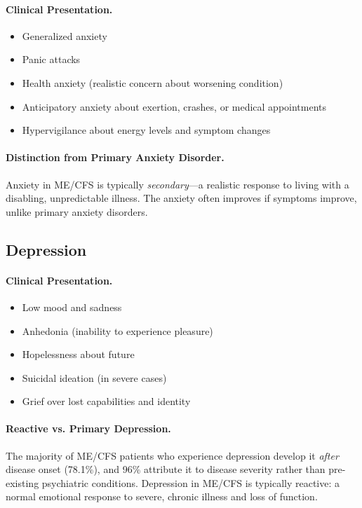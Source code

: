 \paragraph{Clinical Presentation.}
\begin{itemize}
    \item Generalized anxiety
    \item Panic attacks
    \item Health anxiety (realistic concern about worsening condition)
    \item Anticipatory anxiety about exertion, crashes, or medical appointments
    \item Hypervigilance about energy levels and symptom changes
\end{itemize}

\paragraph{Distinction from Primary Anxiety Disorder.}
Anxiety in ME/CFS is typically \emph{secondary}---a realistic response to living with a disabling, unpredictable illness. The anxiety often improves if symptoms improve, unlike primary anxiety disorders.

\subsection{Depression}
\label{subsec:depression}

\paragraph{Clinical Presentation.}
\begin{itemize}
    \item Low mood and sadness
    \item Anhedonia (inability to experience pleasure)
    \item Hopelessness about future
    \item Suicidal ideation (in severe cases)
    \item Grief over lost capabilities and identity
\end{itemize}

\paragraph{Reactive vs. Primary Depression.}
The majority of ME/CFS patients who experience depression develop it \emph{after} disease onset (78.1\%), and 96\% attribute it to disease severity rather than pre-existing psychiatric conditions. Depression in ME/CFS is typically reactive: a normal emotional response to severe, chronic illness and loss of function.


